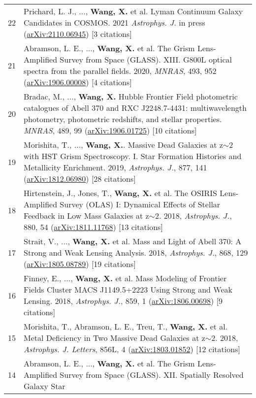 \documentclass[letterpaper,12pt]{article}
\begin{document}
\begin{longtable}{rp{5.8in}}
22  &   Prichard, L. J., ..., \textbf{Wang, X.} et al. Lyman Continuum Galaxy Candidates in COSMOS. 2021 \textit{Astrophys. J.} in 
    press (\href{https://arxiv.org/abs/2110.06945}{arXiv:2110.06945}) [3 citations]  \\
21  &   Abramson, L. E., ..., \textbf{Wang, X.} et al. The Grism Lens-Amplified Survey from Space (GLASS). XIII. G800L optical spectra from the 
    parallel fields. 2020, \textit{MNRAS}, 493, 952 (\href{https://arxiv.org/abs/1906.00008}{arXiv:1906.00008}) [4 citations]  \\
20  &   Bradac, M., ..., \textbf{Wang, X.} Hubble Frontier Field photometric catalogues of Abell 370 and RXC J2248.7-4431: 
    multiwavelength photometry, photometric redshifts, and stellar properties. \textit{MNRAS}, 489, 99 
    (\href{https://arxiv.org/abs/1906.01725}{arXiv:1906.01725}) [10 citations]  \\
19  &   Morishita, T., ..., \textbf{Wang, X.}. Massive Dead Galaxies at z$\sim$2 with HST Grism Spectroscopy. I. Star Formation Histories and 
    Metallicity Enrichment. 2019, \textit{Astrophys. J.}, 877, 141 (\href{https://arxiv.org/abs/1812.06980}{arXiv:1812.06980}) [28 citations] \\
18  &   Hirtenstein, J., Jones, T., \textbf{Wang, X.} et al. The OSIRIS Lens-Amplified Survey (OLAS) I: Dynamical Effects of Stellar Feedback in Low 
    Mass Galaxies at z$\sim$2. 2018, \textit{Astrophys. J.}, 880, 54 (\href{https://arxiv.org/abs/1811.11768}{arXiv:1811.11768}) 
    [13 citations] \\
17  &   Strait, V., ..., \textbf{Wang, X.} et al. Mass and Light of Abell 370: A Strong and Weak Lensing Analysis. 2018, \textit{Astrophys. J.}, 868, 
    129 (\href{https://arxiv.org/abs/1805.08789}{arXiv:1805.08789}) [19 citations] \\
16  &   Finney, E., ..., \textbf{Wang, X.} et al. Mass Modeling of Frontier Fields Cluster MACS J1149.5+2223 Using Strong and Weak Lensing. 2018, 
    \textit{Astrophys. J.}, 859, 1 (\href{https://arxiv.org/abs/1806.00698}{arXiv:1806.00698}) [9 citations] \\
15  &   Morishita, T., Abramson, L. E., Treu, T., \textbf{Wang, X.} et al.  Metal Deficiency in Two Massive Dead Galaxies at z$\sim$2. 2018, 
    \textit{Astrophys. J. Letters}, 856L, 4 (\href{https://arxiv.org/abs/1803.01852}{arXiv:1803.01852}) [12 citations]  \\
14  &   Abramson, L. E., ..., \textbf{Wang, X.} et al. The Grism Lens-Amplified Survey from Space (GLASS). XII. Spatially Resolved Galaxy Star 

\end{longtable}
\end{document}
